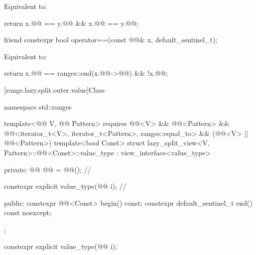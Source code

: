\begin{itemdescr}
\pnum
\effects
Equivalent to:
\begin{codeblock}
return x.@@ == y.@@ && x.@@ == y.@@;
\end{codeblock}
\end{itemdescr}

%
\begin{itemdecl}
friend constexpr bool operator==(const @@& x, default_sentinel_t);
\end{itemdecl}

\begin{itemdescr}
\pnum
\effects
Equivalent to:
\begin{codeblock}
return x.@@ == ranges::end(x.@@->@@) && !x.@@;
\end{codeblock}
\end{itemdescr}

[range.lazy.split.outer.value]{Class }

%
\begin{codeblock}
namespace std::ranges {
  template<@@ V, @@ Pattern>
    requires @@<V> && @@<Pattern> &&
             @@<iterator_t<V>, iterator_t<Pattern>, ranges::equal_to> &&
             (@@<V> || @@<Pattern>)
  template<bool Const>
  struct lazy_split_view<V, Pattern>::@@<Const>::value_type
    : view_interface<value_type> {
  private:
    @@ @@ = @@();               // \expos

    constexpr explicit value_type(@@ i);    // \expos

  public:
    constexpr @@<Const> begin() const;
    constexpr default_sentinel_t end() const noexcept;
  };
}
\end{codeblock}

%
\begin{itemdecl}
constexpr explicit value_type(@@ i);
\end{itemdecl}

